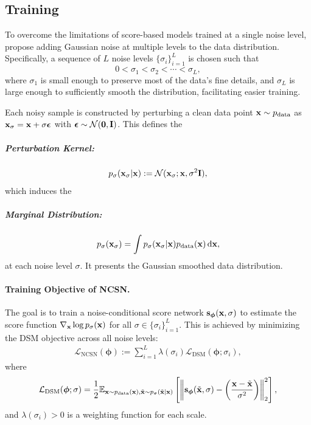 \subsection{Training}
To overcome the limitations of score-based models trained at a single noise level, \citet{song2019generative} propose adding Gaussian noise at multiple levels to the data distribution. Specifically, a sequence of $L$ noise levels $\{\sigma_i\}_{i=1}^L$ is chosen such that
\[
0 < \sigma_1 < \sigma_2 < \cdots < \sigma_L,
\]
where $\sigma_1$ is small enough to preserve most of the data's fine details, and $\sigma_L$ is large enough to sufficiently smooth the distribution, facilitating easier training.

Each noisy sample is constructed by perturbing a clean data point ${\mathbf{x}} \sim p_{\text{data}}$ as ${\mathbf{x}}_{\sigma} = {\mathbf{x}} + \sigma \bm{\epsilon}$ with $ \bm{\epsilon} \sim \mathcal{N}(\bm{0}, {\mathbf{I}})$. This defines the  
\vspace{-0.4cm}
\subparagraph{Perturbation Kernel:}
\[
p_{\sigma}({\mathbf{x}}_{\sigma} | {\mathbf{x}}) := \mathcal{N}({\mathbf{x}}_{\sigma}; {\mathbf{x}}, \sigma^2 {\mathbf{I}}),
\]
which induces the  
\vspace{-0.4cm}
\subparagraph{Marginal Distribution:}
\[
p_\sigma({\mathbf{x}}_{\sigma}) = \int p_{\sigma} ({\mathbf{x}}_{\sigma} | {\mathbf{x}})    p_{\text{data}}({\mathbf{x}}) \mathop{}\!\mathrm{d} {\mathbf{x}},
\]
at each noise level $\sigma$. It presents the Gaussian smoothed data distribution.

\paragraph{Training Objective of NCSN.}

The goal is to train a noise-conditional score network ${\mathbf{s}}_{\bm{\phi}}({\mathbf{x}}, \sigma)$ to estimate the score function $\nabla_{{\mathbf{x}}} \log p_\sigma({\mathbf{x}})$ for all $\sigma \in \{\sigma_i\}_{i=1}^L$. This is achieved by minimizing the DSM objective across all noise levels:
\begin{align}\label{eq:nscn}
\mathcal{L}_{\text{NCSN}}(\bm{\phi}) := \sum_{i=1}^{L} \lambda(\sigma_i)   \mathcal{L}_{\text{DSM}}(\bm{\phi}; \sigma_i),
\end{align}
where
\begin{align*}
\mathcal{L}_{\text{DSM}}(\bm{\phi}; \sigma) 
= \frac{1}{2} \mathbb{E}_{{\mathbf{x}} \sim p_{\text{data}}({\mathbf{x}}),   \tilde{{\mathbf{x}}} \sim p_{\sigma}(\tilde{{\mathbf{x}}} | {\mathbf{x}})} 
\left[ \left\lVert{\mathbf{s}}_{\bm{\phi}}(\tilde{{\mathbf{x}}}, \sigma) - \left( \frac{{\mathbf{x}} - \tilde{{\mathbf{x}}}}{\sigma^2} \right)\right\rVert_2^2 \right],
\end{align*}
and $\lambda(\sigma_i)>0$ is a weighting function for each scale.

